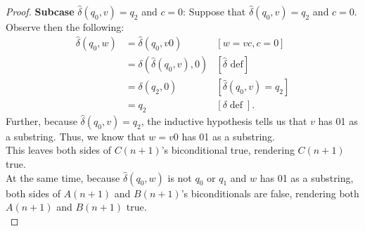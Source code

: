 \documentclass[10pt]{article}
\begin{document}
\begin{enumerate}[label={}]
\begin{proof}
                  \textbf{Subcase }$\hat{\delta}\left(q_0, v\right)=q_2$ and $c=0$: Suppose that $\hat{\delta}\left(q_0, v\right)=q_2$ and $c=0$. Observe then the following:
                  $$
                        \begin{aligned}
                              \hat{\delta}\left(q_0, w\right) & =\hat{\delta}\left(q_0, v 0\right)                     & {[w=v c, c=0] }                                     \\
                                                              & =\delta\left(\hat{\delta}\left(q_0, v\right), 0\right) & {[\hat{\delta} \text { def}] }                      \\
                                                              & =\delta\left(q_2, 0\right)                             & {\left[\hat{\delta}\left(q_0, v\right)=q_2\right] } \\
                                                              & =q_2                                                   & {[\delta \operatorname{def}] . }
                        \end{aligned}
                  $$
                  Further, because $\hat{\delta}\left(q_0, v\right)=q_2$, the inductive hypothesis tells us that $v$ has 01 as a substring. Thus, we know that $w=v0$ has 01 as a substring.\\
                  This leaves both sides of $C(n+1)$'s biconditional true, rendering $C(n+1)$ true.\\
                  At the same time, because $\hat{\delta}\left(q_0, w\right)$ is not $q_0$ or $q_1$ and $w$ has 01 as a substring, both sides of $A(n+1)$ and $B(n+1)$'s biconditionals are false, rendering both $A(n+1)$ and $B(n+1)$ true.\\


\end{proof}
\end{enumerate}
\end{document}
